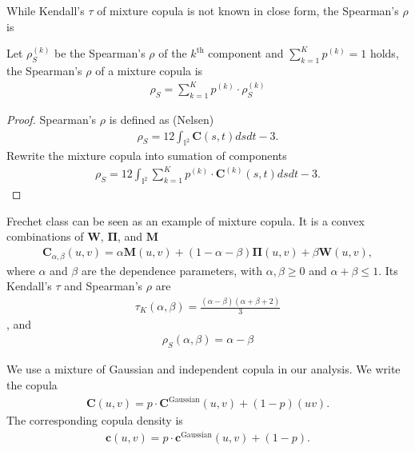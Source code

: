 While Kendall's $\tau$ of mixture copula is not known in close form,
the Spearman's $\rho$ is

\begin{proposition}
    Let $\rho_S^{(k)}$ be the Spearman's $\rho$ of the $k^\text{th}$ component and $\sum_{k=1}^K p^{(k)}=1$ holds,
    the Spearman's $\rho$ of a mixture copula is
    \begin{align}
        \rho_S = \sum_{k=1}^K p^{(k)} \cdot \rho_S^{(k)}
        \end{align}
    \end{proposition}

\begin{proof}
    Spearman's $\rho$ is defined as (Nelsen)
    \begin{align}
        \rho_S = 12 \int_{\mathbb{I}^2} \bm{C}(s,t) ds dt - 3.
        \end{align}
    Rewrite the mixture copula into sumation of components
       \begin{align}
        \rho_S = 12 \int_{\mathbb{I}^2} \sum_{k=1}^K p^{(k)} \cdot \bm{C}^{(k)}(s,t) ds dt - 3.
        \end{align}
    \end{proof}

\begin{example}
    Frechet class can be seen as an example of mixture copula.
    It is a convex combinations of $\bm{W}$, $\bm{\Pi}$, and $\bm{M}$ \citep{Nelsen1999}
    \begin{align}
        \bm{C}_{\alpha, \beta}(u,v)
        = \alpha \bm{M}(u,v) +
        (1-\alpha-\beta)\bm{\Pi}(u,v)
        +\beta \bm{W}(u,v),
        \end{align}
    where $\alpha$ and $\beta$ are the dependence parameters, with $\alpha, \beta \geq 0$ and
    $\alpha+\beta \leq 1$.
    Its Kendall's $\tau$ and Spearman's $\rho$ are
    \begin{align}
        \tau_K(\alpha, \beta) = \frac{(\alpha - \beta)(\alpha+\beta+2)}{3}
        \end{align}
    , and
    \begin{align}
        \rho_S(\alpha, \beta) = \alpha - \beta
        \end{align}
    \end{example}\medskip

We use a mixture of Gaussian and independent copula in our analysis.
We write the copula
\begin{align}
    \bm{C}(u,v) = p\cdot \bm{C}^\text{Gaussian}(u,v) + (1-p)(uv).
    \end{align}
The corresponding copula density is
\begin{align}
    \bm{c}(u,v) = p\cdot \bm{c}^\text{Gaussian}(u,v) + (1-p).
    \end{align}

